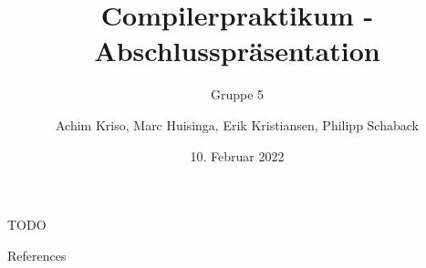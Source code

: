 \documentclass[en,16:9]{sdqbeamer}
\title[]{Compilerpraktikum - Abschlusspräsentation}
\subtitle{Gruppe 5}
\author[]{Achim Kriso, Marc Huisinga, Erik Kristiansen, Philipp Schaback}
\date[10.\,2.\,2022]{10. Februar 2022}
\begin{document}
\KITtitleframe

\begin{frame}{TODO}
\end{frame}

\appendix
\beginbackup

\begin{frame}{References}
\printbibliography
\end{frame}


\backupend
\end{document}
